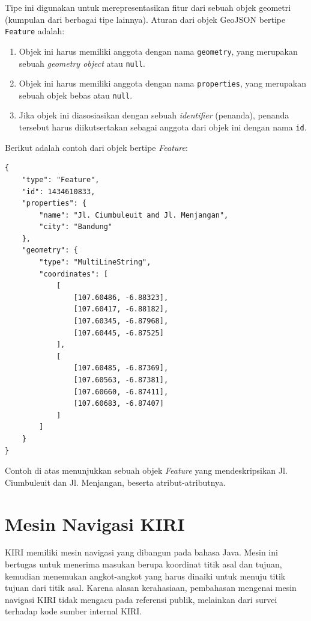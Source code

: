Tipe ini digunakan untuk merepresentasikan fitur dari sebuah objek geometri (kumpulan dari berbagai tipe lainnya). Aturan dari objek GeoJSON bertipe \texttt{Feature} adalah:

\begin{enumerate}
	\item Objek ini harus memiliki anggota dengan nama \texttt{geometry}, yang merupakan sebuah \textit{geometry object} atau \texttt{null}.
	\item Objek ini harus memiliki anggota dengan nama \texttt{properties}, yang merupakan sebuah objek bebas atau \texttt{null}.
	\item Jika objek ini diasosiasikan dengan sebuah \textit{identifier} (penanda), penanda tersebut harus diikutsertakan sebagai anggota dari objek ini dengan nama \texttt{id}.
\end{enumerate}

Berikut adalah contoh dari objek bertipe \textit{Feature}:

\begin{lstlisting}
{
	"type": "Feature",
	"id": 1434610833,
	"properties": {
		"name": "Jl. Ciumbuleuit and Jl. Menjangan",
		"city": "Bandung"
	},
	"geometry": {
		"type": "MultiLineString",
		"coordinates": [
			[
				[107.60486, -6.88323],
				[107.60417, -6.88182],
				[107.60345, -6.87968],
				[107.60445, -6.87525]
			],
			[
				[107.60485, -6.87369],
				[107.60563, -6.87381],
				[107.60660, -6.87411],
				[107.60683, -6.87407]
			]
		]
	}
}
\end{lstlisting}

Contoh di atas menunjukkan sebuah objek \textit{Feature} yang mendeskripsikan Jl. Ciumbuleuit dan Jl. Menjangan, beserta atribut-atributnya.

\section{Mesin Navigasi KIRI}

KIRI memiliki mesin navigasi yang dibangun pada bahasa Java. Mesin ini bertugas untuk menerima masukan berupa koordinat titik asal dan tujuan, kemudian menemukan angkot-angkot yang harus dinaiki untuk menuju titik tujuan dari titik asal. Karena alasan kerahasiaan, pembahasan mengenai mesin navigasi KIRI tidak mengacu pada referensi publik, melainkan dari survei terhadap kode sumber internal KIRI.

